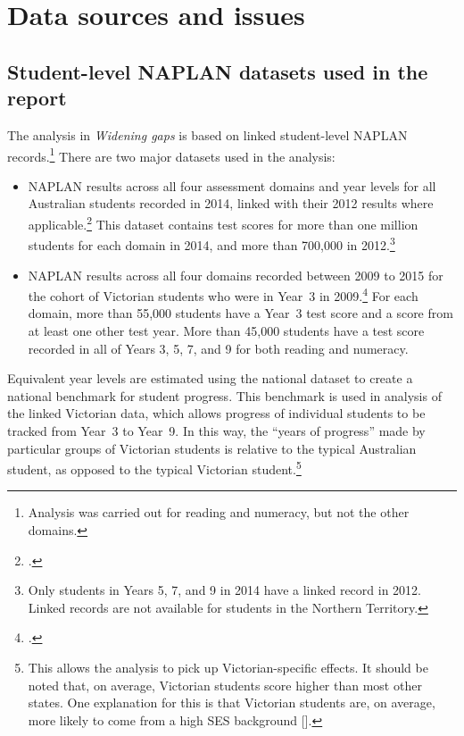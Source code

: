 \chapter{Data sources and issues} \label{chap2}

\section{Student-level NAPLAN datasets used in the report}


The analysis in \textit{Widening gaps} is based on linked student-level NAPLAN records.\footnote{Analysis was carried out for reading and numeracy, but not the other domains.} There are two major datasets used in the analysis:
\begin{itemize}
\item NAPLAN results across all four assessment domains and year levels for all Australian students recorded in 2014, linked with their 2012 results where applicable.\footcite{acara2014} This dataset contains test scores for more than one million students for each domain in 2014, and more than 700,000 in 2012.\footnote{Only students in Years 5, 7, and 9 in 2014 have a linked record in 2012. Linked records are not available for students in the Northern Territory.}
\item NAPLAN results across all four domains recorded between 2009 to 2015 for the cohort of Victorian students who were in \mbox{Year 3} in 2009.\footcite{vcaa2015} For each domain, more than 55,000 students have a \mbox{Year 3} test score and a score from at least one other test year. More than 45,000 students have a test score recorded in all of Years 3, 5, 7, and 9 for both reading and numeracy. 
\end{itemize}

Equivalent year levels are estimated using the national dataset to create a national benchmark for student progress. This benchmark is used in analysis of the linked Victorian data, which allows progress of individual students to be tracked from \mbox{Year 3} to \mbox{Year 9}. In this way, the ``years of progress'' made by particular groups of Victorian students is relative to the typical Australian student, as opposed to the typical Victorian student.\footnote{This allows the analysis to pick up Victorian-specific effects. It should be noted that, on average, Victorian students score higher than most other states. One explanation for this is that Victorian students are, on average, more likely to come from a high SES background [\textcite{acara2014}].}

